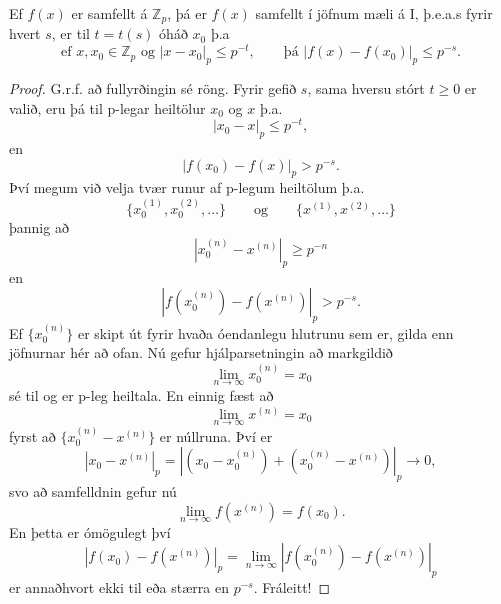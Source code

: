 \begin{setn}
Ef $f(x)$ er samfellt á $\mathbb{Z}_p$, þá er $f(x)$ samfellt í jöfnum mæli á I, þ.e.a.s fyrir hvert $s$, er til $t=t(s)$ óháð $x_0$ þ.a 
\begin{equation}
\mbox{ef   } x,x_0\in \mathbb{Z}_p \mbox{ og  } |x-x_0|_p \leq p^{-t}, \qquad \mbox{þá  } |f(x)-f(x_0)|_p \leq p^{-s}.
\end{equation}
\end{setn} 
\begin{proof}
G.r.f. að fullyrðingin sé röng. Fyrir gefið $s$, sama hversu stórt $t \geq 0$ er valið, eru þá til p-legar heiltölur $x_0$ og $x$ þ.a.
\begin{equation*}
|x_0-x|_p \leq p^{-t},
\end{equation*}
en
\begin{equation*}
|f(x_0)-f(x)|_p > p^{-s}.
\end{equation*}
Því megum við velja tvær runur af p-legum heiltölum þ.a.
\begin{equation*}
\{x_0^{(1)}, x_0^{(2)}, \ldots \} \qquad \mbox{og} \qquad \{x^{(1)}, x^{(2)}, \ldots\}
\end{equation*}
þannig að
\begin{equation*}
|x_0^{(n)}-x^{(n)} |_p \geq p^{-n}
\end{equation*}
en 
\begin{equation*}
|f(x_0^{(n)}) - f(x^{(n)})|_p > p^{-s}.
\end{equation*}
Ef $\{x_0^{(n)}\}$ er skipt út fyrir hvaða óendanlegu hlutrunu sem er, gilda enn jöfnurnar hér að ofan. 
Nú gefur hjálparsetningin að markgildið
\begin{equation*}
\lim_{n\rightarrow \infty} x_0^{(n)}  = x_0
\end{equation*}
sé til og er p-leg heiltala. En einnig fæst að
\begin{equation*}
\lim_{n\rightarrow \infty} x^{(n)} = x_0
\end{equation*}
 fyrst að $\{x_0^{(n)} - x^{(n)} \}$ er núllruna. Því er 
\begin{equation*}
|x_0-x^{(n)}|_p = |(x_0 - x_0^{(n)} )+ (x_0^{(n)} -x^{(n)}) |_p \rightarrow 0,
\end{equation*}
svo að samfelldnin gefur nú
\begin{equation*}
\lim_{n\rightarrow \infty} f(x^{(n)}) = f(x_0).
\end{equation*}
En þetta er ómögulegt því
\begin{equation*}
|f(x_0)-f(x^{(n)})|_p = \lim_{n\rightarrow \infty} |f(x_0^{(n)}) - f(x^{(n)})|_p
\end{equation*}
er annaðhvort ekki til eða stærra en $p^{-s}$. Fráleitt!
\end{proof}

